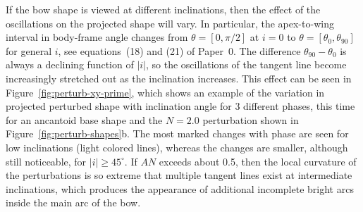 If the bow shape is viewed at different inclinations, then the effect
of the oscillations on the projected shape will vary.  In particular,
the apex-to-wing interval in body-frame angle changes from
\(\theta = [0, \pi/2]\) at \(i = 0\) to
\(\theta = [\theta_0, \theta_{90}]\) for general \(i\), see equations~(18) and (21)
of Paper~0.  The difference \(\theta_{90} - \theta_0\) is always a declining
function of \(|i|\), so the oscillations of the tangent line become
increasingly stretched out as the inclination increases.  This effect
can be seen in Figure~\ref{fig:perturb-xy-prime}, which shows an
example of the variation in projected perturbed shape with inclination
angle for 3 different phases, this time for an ancantoid base shape
and the \(N = 2.0\) perturbation shown in
Figure~\ref{fig:perturb-shapes}b.  The most marked changes with phase
are seen for low inclinations (light colored lines), whereas the
changes are smaller, although still noticeable, for
\(|i| \ge 45^\circ\). If \(A N\) exceeds about 0.5, then the local curvature
of the perturbations is so extreme that multiple tangent lines exist
at intermediate inclinations, which produces the appearance of
additional incomplete bright arcs inside the main arc of the bow.


